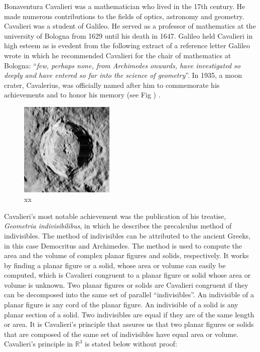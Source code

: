 \documentclass{article}
\theoremstyle{theorem}
\theoremstyle{definition}
\begin{document}
\noindent
Bonaventura Cavalieri was a mathematician who lived in the 17th century. He made numerous contributions to the fields of optics, astronomy and geometry. 
Cavalieri was a student of Galileo. He served as a professor of mathematics at the university of Bologna from 1629 until his death in 1647. 
Galileo held Cavalieri in high esteem as is evedent from the following extract of a reference letter Galileo wrote in which he recommended Cavalieri for the chair of mathematics at Bologna: ``\emph{few, perhaps none, from 
Archimedes onwards, have investigated so deeply and have entered so far into the science of geometry}''. In 1935, a moon crater, Cavalerius, was officially named after him to commemorate his achievements and to honor his memory (see Fig ) \cite{?}. 
\begin{figure}[htb]
\centering
\includegraphics[width=0.4\textwidth]{crater.jpg}
\caption{xx}
\label{fig:crater}
\end{figure}
Cavalieri's most notable achievement was the publication of his 
treatise, \emph{Geometria indivisibilibus}, in which he describes the precalculus method of indivisibles. The method of indivisibles can be attributed to the ancient Greeks,
in this case Democritus and Archimedes. The method is used to compute the area and the volume of complex planar figures and solids, respectively.
It works by finding a planar figure or a solid, whose area or volume can easily be computed, which is Cavalieri congruent to a planar figure or solid whose 
area or volume is unknown. Two planar figures or solids are Cavalieri congruent if they can be decomposed into the same set of parallel ``indivisibles''. An indivisible of 
a planar figure is any cord of the planar figure. An indivisible of a solid is any planar section of a solid. Two indivisibles are equal if they are of the same length or area.
It is Cavalieri's principle that assures us that two planar figures or solids that are composed of the same set of indivisibles have equal area or volume. Cavalieri's principle 
in $\mathbb{R}^3$ is stated below without proof:
\end{document}
